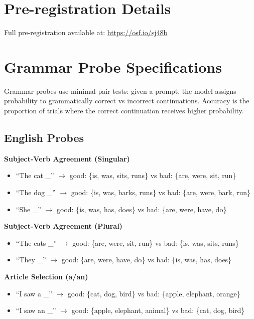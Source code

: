 \documentclass[11pt,a4paper]{article}
\begin{document}
\appendix

\section{Pre-registration Details}

Full pre-registration available at: \url{https://osf.io/sj48b}

\section{Grammar Probe Specifications}

Grammar probes use minimal pair tests: given a prompt, the model assigns probability to grammatically correct vs incorrect continuations. Accuracy is the proportion of trials where the correct continuation receives higher probability.

\subsection{English Probes}

\textbf{Subject-Verb Agreement (Singular)}
\begin{itemize}
    \item ``The cat \_'' $\rightarrow$ good: \{is, was, sits, runs\} vs bad: \{are, were, sit, run\}
    \item ``The dog \_'' $\rightarrow$ good: \{is, was, barks, runs\} vs bad: \{are, were, bark, run\}
    \item ``She \_'' $\rightarrow$ good: \{is, was, has, does\} vs bad: \{are, were, have, do\}
\end{itemize}

\textbf{Subject-Verb Agreement (Plural)}
\begin{itemize}
    \item ``The cats \_'' $\rightarrow$ good: \{are, were, sit, run\} vs bad: \{is, was, sits, runs\}
    \item ``They \_'' $\rightarrow$ good: \{are, were, have, do\} vs bad: \{is, was, has, does\}
\end{itemize}

\textbf{Article Selection (a/an)}
\begin{itemize}
    \item ``I saw a \_'' $\rightarrow$ good: \{cat, dog, bird\} vs bad: \{apple, elephant, orange\}
    \item ``I saw an \_'' $\rightarrow$ good: \{apple, elephant, animal\} vs bad: \{cat, dog, bird\}
\end{itemize}
\end{document}
